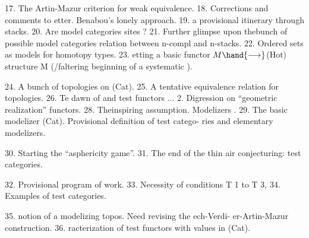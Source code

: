 17.  The Artin-Mazur  criterion for weak equivalence.
18.  Corrections and comments to etter.  Benabou's lonely approach.
19.   a provisional itinerary \hand{(}through stacks\hand{)}. \margin{\rule{2cm}{0.4pt}}
20.  Are model categories sites ?
21.  Further glimpse upon thebunch of possible model categories\hand{;} 
relation between n-compl and n-stacks.
22.  Ordered sets as models for homotopy types.
\margin{$\bigcirc$}23.  etting a basic functor  $M \hand{\longrightarrow}$(Hot)    structure M
(/faltering beginning of a systematic ). \margin{\rule{2cm}{0.4pt}}

24.  A bunch of topologies on (Cat).
25.  A tentative equivalence relation for topologies.
26.  Te dawn of   and test functors ...
2.  Digression on ``geometric realization'' functors. \margin{\rule{2cm}{0.4pt}}
\margin{$\bigcirc$}28.  Theinspiring assumption.  Modelizers .
29.  The basic modelizer (Cat).  Provisional definition of test catego-%
ries and elementary modelizers. \margin{\rule{2cm}{0.4pt}}

30.  Starting  the ``asphericity game''.
\margin{$\bigcirc$}31.  The end of the thin air conjecturing:   test
categories. \margin{\rule{2cm}{0.4pt}}

\margin{$\downarrow$}32.  Provisional program of work.
\margin{$\bigcirc$}33.  Necessity of conditions T 1 to T 3, 
34.  Examples of test categories. \margin{\rule{2cm}{0.4pt}}

35.   notion of a modelizing topos.   Need revising the ech-Verdi-%
er-Artin-Mazur construction.
36.  racterization of test functors with values in (Cat). \margin{\rule{2cm}{0.4pt}}

